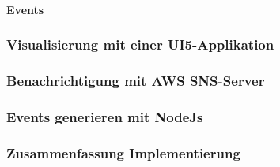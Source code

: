 \paragraph{Events}

\subsubsection{Visualisierung mit einer UI5-Applikation}

\subsubsection{Benachrichtigung mit AWS SNS-Server}

\subsubsection{Events generieren mit NodeJs}

\subsubsection{Zusammenfassung Implementierung}

\newpage
